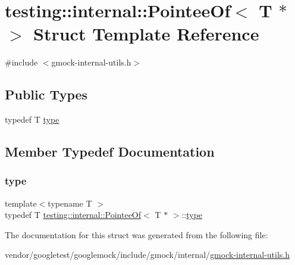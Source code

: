 \hypertarget{structtesting_1_1internal_1_1_pointee_of_3_01_t_01_5_01_4}{}\section{testing\+:\+:internal\+:\+:Pointee\+Of$<$ T $\ast$ $>$ Struct Template Reference}
\label{structtesting_1_1internal_1_1_pointee_of_3_01_t_01_5_01_4}


{\ttfamily \#include $<$gmock-\/internal-\/utils.\+h$>$}

\subsection*{Public Types}
\begin{DoxyCompactItemize}
\item 
typedef T \hyperlink{structtesting_1_1internal_1_1_pointee_of_3_01_t_01_5_01_4_a91dde514cd3a8c07cedbe5336c36a55f}{type}
\end{DoxyCompactItemize}


\subsection{Member Typedef Documentation}
\mbox{\label{structtesting_1_1internal_1_1_pointee_of_3_01_t_01_5_01_4_a91dde514cd3a8c07cedbe5336c36a55f}} 
\subsubsection{\texorpdfstring{type}{type}}
{\footnotesize\ttfamily template$<$typename T $>$ \\
typedef T \hyperlink{structtesting_1_1internal_1_1_pointee_of}{testing\+::internal\+::\+Pointee\+Of}$<$ T $\ast$ $>$\+::\hyperlink{structtesting_1_1internal_1_1_pointee_of_3_01_t_01_5_01_4_a91dde514cd3a8c07cedbe5336c36a55f}{type}}



The documentation for this struct was generated from the following file\+:\begin{DoxyCompactItemize}
\item 
vendor/googletest/googlemock/include/gmock/internal/\hyperlink{gmock-internal-utils_8h}{gmock-\/internal-\/utils.\+h}\end{DoxyCompactItemize}
